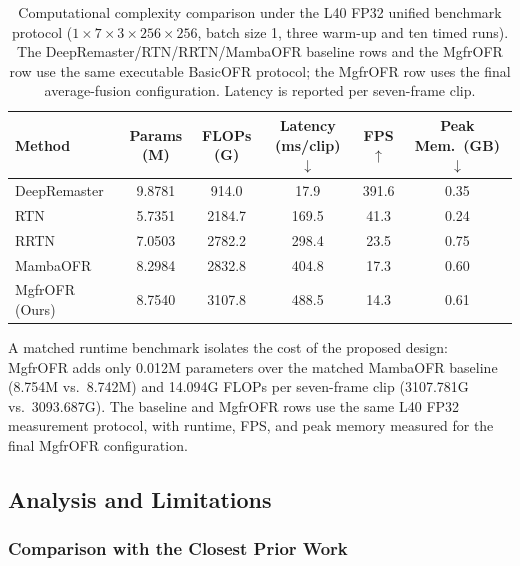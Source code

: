 \begin{table}[htbp]
\caption{Computational complexity comparison under the L40 FP32 unified benchmark protocol ($1{\times}7{\times}3{\times}256{\times}256$, batch size 1, three warm-up and ten timed runs). The DeepRemaster/RTN/RRTN/MambaOFR baseline rows and the MgfrOFR row use the same executable BasicOFR protocol; the MgfrOFR row uses the final average-fusion configuration. Latency is reported per seven-frame clip.\label{tab:complexity}}
\begin{tabularx}{\textwidth}{lCCCCC}
\toprule
\textbf{Method} & \textbf{Params (M)} & \textbf{FLOPs (G)} & \textbf{Latency (ms/clip)$\downarrow$} & \textbf{FPS$\uparrow$} & \textbf{Peak Mem.\ (GB)$\downarrow$} \\
\midrule
DeepRemaster~\cite{iizuka2019deepremaster}   & 9.8781 & 914.0  & 17.9  & 391.6 & 0.35 \\
RTN~\cite{wan2022rtn}                        & 5.7351 & 2184.7 & 169.5 & 41.3  & 0.24 \\
RRTN~\cite{lin2024rrtn}                      & 7.0503 & 2782.2 & 298.4 & 23.5  & 0.75 \\
MambaOFR~\cite{mao2025mambaofr}              & 8.2984 & 2832.8 & 404.8 & 17.3  & 0.60 \\
\midrule
MgfrOFR (Ours)                              & 8.7540 & 3107.8 & 488.5 & 14.3  & 0.61 \\
\bottomrule
\end{tabularx}
\end{table}

A matched runtime benchmark isolates the cost of the proposed design: MgfrOFR adds only 0.012M parameters over the matched MambaOFR baseline (8.754M vs.\ 8.742M) and 14.094G FLOPs per seven-frame clip (3107.781G vs.\ 3093.687G). The baseline and MgfrOFR rows use the same L40 FP32 measurement protocol, with runtime, FPS, and peak memory measured for the final MgfrOFR configuration.

\FloatBarrier
\subsection{Analysis and Limitations}
\label{subsec:analysis_limitations}

\subsubsection{Comparison with the Closest Prior Work}
\label{subsec:vs_mambaofr}

